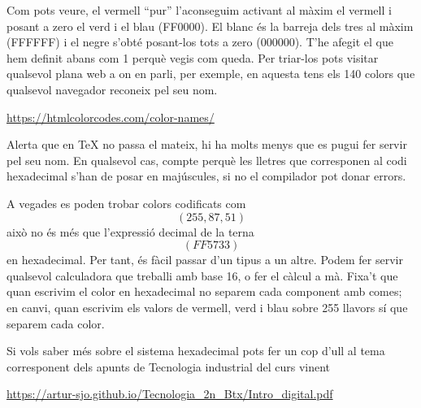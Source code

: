 \documentclass[a4paper,12pt]{article}
\begin{document}
\begin{center}
\end{center}

Com pots veure, el vermell ``pur'' l'aconseguim activant al màxim el vermell i posant a zero el verd i el blau (FF0000). El blanc és la barreja dels tres al màxim (FFFFFF) i el negre s'obté posant-los tots a zero (000000). T'he afegit el que hem definit abans com 1 perquè vegis com queda.
Per triar-los pots visitar qualsevol plana web a on en parli, per exemple, en aquesta tens els 140 colors que qualsevol navegador reconeix pel seu nom.

\begin{center}
\url{https://htmlcolorcodes.com/color-names/}
\end{center}
\bigskip

 Alerta que en \TeX\; no passa el mateix, hi ha molts menys que es pugui fer servir pel seu nom. En qualsevol cas, compte perquè les lletres que corresponen al codi hexadecimal s'han de posar en majúscules, si no el compilador pot donar errors. 

A vegades es poden trobar colors codificats com 
$$(255,87,51)$$
això no és més que l'expressió decimal de la terna
$$(FF5733)$$
en hexadecimal. Per tant, és fàcil passar d'un tipus a un altre. Podem fer servir qualsevol calculadora que treballi amb base 16, o fer el càlcul a mà. Fixa't que quan escrivim el color en hexadecimal no separem cada component amb comes; en canvi, quan  escrivim els valors de vermell, verd i blau sobre 255 llavors sí que separem cada color.
\bigskip

Si vols saber més sobre el sistema hexadecimal pots fer un cop d'ull al tema corresponent dels apunts de Tecnologia industrial del curs vinent 

\begin{center}
\url{https://artur-sjo.github.io/Tecnologia_2n_Btx/Intro_digital.pdf}
\end{center}
\end{document}
